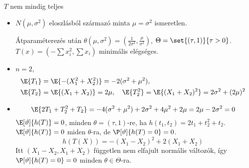 \documentclass[aspectratio=169,notheorems,9pt,\option]{beamer}
\begin{document}
\begin{frame}{$T$ nem mindig teljes}
  \begin{itemize}
    \item $N(\mu,\sigma^2)$ eloszlásból származó minta $\mu=\sigma^2$  ismeretlen.
    
    Átparaméterezés után $\theta(\mu,\sigma^2)=(\tfrac1{2\sigma^2},\tfrac\mu{\sigma^2})$,
    $\Theta=\set{(\tau,1)}{\tau>0}$. $T(x)=(-\sum x_i^2,\sum x_i)$ minimális elégséges.

    \item $n=2$, 
    \begin{align*}
      \E{T_1}&= \E{-(X_1^2+X_2^2)}=-2(\sigma^2+\mu^2),\\
      \E{T_2}&= \E{(X_1+X_2)} =2\mu,\quad
      \E{T^2_2}=\E{(X_1+X_2)^2} = 2\sigma^2+(2\mu)^2
    \end{align*}
    \item 
    \begin{displaymath}
      \E{2T_1+T_2^2 + T_2} = -4(\sigma^2+\mu^2)+2\sigma^2+4\mu^2+2\mu=2\mu-2\sigma^2=0  
    \end{displaymath}
    $\E[\theta]{h(T)}=0$, minden $\theta=(\tau,1)$-re, ha 
    $h(t_1,t_2)=2t_1+t_2^2+ t_2$.   
    $\E[\theta]{h(T)}=0$ miden $\theta$-ra, de $\P[\theta]{h(T)=0}=0$.
    \begin{displaymath}
      h(T(X))=-(X_1-X_2)^2+2(X_1+X_2)
    \end{displaymath}
    Itt $(X_1-X_2,X_1+X_2)$ független nem elfajult normális változók, 
    így $\P[\theta]{h(T)=0}=0$ minden $\theta\in\Theta$-ra. 

  \end{itemize}  
\end{frame}
\end{document}
